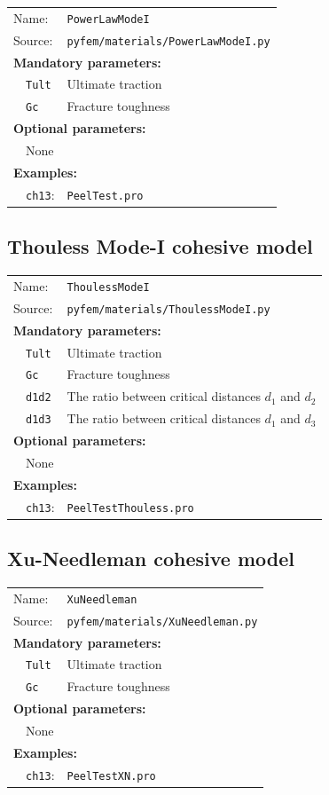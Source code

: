 \documentclass{article}
\begin{document}
\begin{tabular}{p{22mm}p{74mm}}
Name:         & \texttt{PowerLawModeI} \\
Source:  & \texttt{pyfem/materials/PowerLawModeI.py} \\
\multicolumn{2}{l}{\textbf{Mandatory parameters:}} \\
~~\texttt{Tult} & Ultimate traction\\
~~\texttt{Gc} & Fracture toughness \\
\multicolumn{2}{l}{\textbf{Optional parameters:}} \\ 
~~None  & \\
\multicolumn{2}{l}{\textbf{Examples:}}\\
~~\texttt{ch13}: & \texttt{PeelTest.pro}
\end{tabular}

\subsection{Thouless Mode-I cohesive model}

\begin{tabular}{p{22mm}p{74mm}}
Name:         & \texttt{ThoulessModeI} \\
Source:  & \texttt{pyfem/materials/ThoulessModeI.py} \\
\multicolumn{2}{l}{\textbf{Mandatory parameters:}} \\
~~\texttt{Tult} & Ultimate traction\\
~~\texttt{Gc}   & Fracture toughness \\
~~\texttt{d1d2} & The ratio between critical distances $d_1$ and $d_2$\\
~~\texttt{d1d3} & The ratio between critical distances $d_1$ and $d_3$\\
\multicolumn{2}{l}{\textbf{Optional parameters:}} \\ 
~~None  & \\
\multicolumn{2}{l}{\textbf{Examples:}}\\
~~\texttt{ch13}: & \texttt{PeelTestThouless.pro}
\end{tabular}

\subsection{Xu-Needleman cohesive model}

\begin{tabular}{p{22mm}p{74mm}}
Name:         & \texttt{XuNeedleman} \\
Source:  & \texttt{pyfem/materials/XuNeedleman.py} \\
\multicolumn{2}{l}{\textbf{Mandatory parameters:}} \\
~~\texttt{Tult} & Ultimate traction\\
~~\texttt{Gc} & Fracture toughness \\
\multicolumn{2}{l}{\textbf{Optional parameters:}} \\ 
~~None  & \\
\multicolumn{2}{l}{\textbf{Examples:}}\\
~~\texttt{ch13}: & \texttt{PeelTestXN.pro}
\end{tabular}
\end{document}
